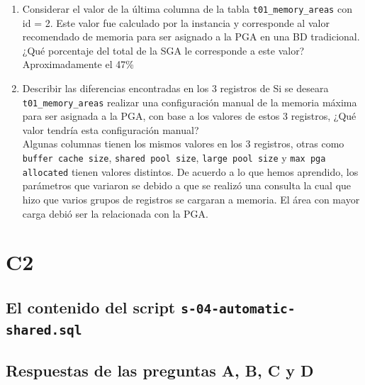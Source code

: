 \documentclass{article}
\begin{document}
\begin{enumerate}[label=\Alph*.]
  \item Considerar el valor de la última columna de la tabla 
    \texttt{t01\_memory\_areas} con id = 2. Este valor fue calculado por la 
    instancia y corresponde al valor recomendado de memoria para ser asignado 
    a la PGA en una BD tradicional. ¿Qué porcentaje del total de la SGA le 
    corresponde a este valor? \\[3mm]
    Aproximadamente el 47\%
  \item Describir las diferencias encontradas en los 3 registros de 
    Si se deseara \texttt{t01\_memory\_areas} realizar una configuración 
    manual de la memoria máxima para ser asignada a la PGA, con base a los 
    valores de estos 3 registros, ¿Qué valor tendría esta configuración manual?
    \\[4mm]
    Algunas columnas tienen los mismos valores en los 3 registros, otras como 
    \texttt{buffer cache size}, \texttt{shared pool size}, \texttt{large pool
    size} y \texttt{max pga allocated} tienen valores distintos. De acuerdo a lo
    que hemos aprendido, los parámetros que variaron se debido a que se realizó
    una consulta la cual que hizo que varios grupos de registros se cargaran a
    memoria. El área con mayor carga debió ser la relacionada con la PGA.
\end{enumerate}

\section*{C2}

\subsection*{El contenido del script \texttt{s-04-automatic-shared.sql}}



\subsection*{Respuestas de las preguntas A, B, C y D}
\end{document}
